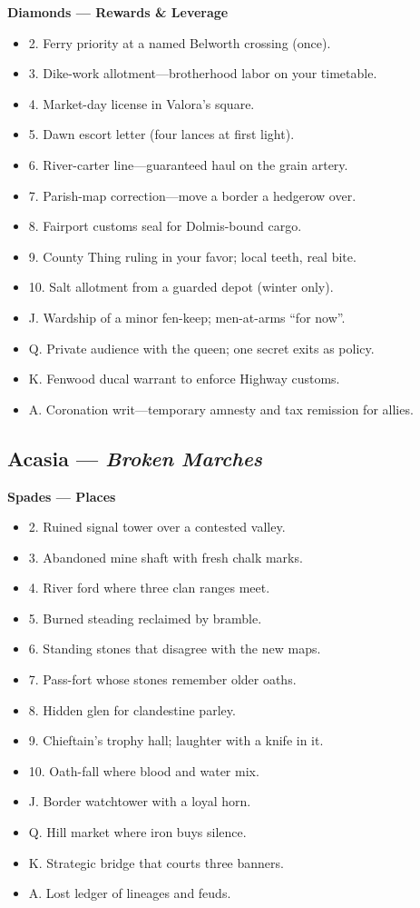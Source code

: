 \begin{multicols}{2}
\textbf{Diamonds — Rewards \& Leverage}
\begin{itemize}
  \item 2. Ferry priority at a named Belworth crossing (once).
  \item 3. Dike-work allotment—brotherhood labor on your timetable.
  \item 4. Market-day license in Valora’s square.
  \item 5. Dawn escort letter (four lances at first light).
  \item 6. River-carter line—guaranteed haul on the grain artery.
  \item 7. Parish-map correction—move a border a hedgerow over.
  \item 8. Fairport customs seal for Dolmis-bound cargo.
  \item 9. County Thing ruling in your favor; local teeth, real bite.
  \item 10. Salt allotment from a guarded depot (winter only).
  \item J. Wardship of a minor fen-keep; men-at-arms “for now”.
  \item Q. Private audience with the queen; one secret exits as policy.
  \item K. Fenwood ducal warrant to enforce Highway customs.
  \item A. Coronation writ—temporary amnesty and tax remission for allies.
\end{itemize}

\subsection*{Acasia — \textit{Broken Marches}}
\textbf{Spades — Places}
\begin{itemize}
  \item 2. Ruined signal tower over a contested valley.
  \item 3. Abandoned mine shaft with fresh chalk marks.
  \item 4. River ford where three clan ranges meet.
  \item 5. Burned steading reclaimed by bramble.
  \item 6. Standing stones that disagree with the new maps.
  \item 7. Pass-fort whose stones remember older oaths.
  \item 8. Hidden glen for clandestine parley.
  \item 9. Chieftain’s trophy hall; laughter with a knife in it.
  \item 10. Oath-fall where blood and water mix.
  \item J. Border watchtower with a loyal horn.
  \item Q. Hill market where iron buys silence.
  \item K. Strategic bridge that courts three banners.
  \item A. Lost ledger of lineages and feuds.
\end{itemize}


\end{multicols}
